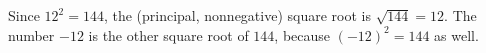 Since $12^2=144$, the (principal, nonnegative) square root is $\sqrt{144}=\boxed{12}$. The number $-12$ is the other square root of $144$, because $(-12)^2=144$ as well.
